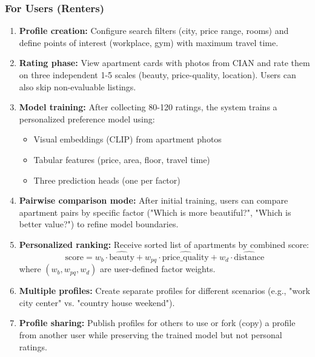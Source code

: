 \documentclass[12pt,a4paper]{article}
\begin{document}
\subsubsection{For Users (Renters)}
\begin{enumerate}
    \item \textbf{Profile creation:} Configure search filters (city, price range, rooms) and define points of interest (workplace, gym) with maximum travel time.
    
    \item \textbf{Rating phase:} View apartment cards with photos from CIAN and rate them on three independent 1-5 scales (beauty, price-quality, location). Users can also skip non-evaluable listings.
    
    \item \textbf{Model training:} After collecting 80-120 ratings, the system trains a personalized preference model using:
    \begin{itemize}
        \item Visual embeddings (CLIP) from apartment photos
        \item Tabular features (price, area, floor, travel time)
        \item Three prediction heads (one per factor)
    \end{itemize}
    
    \item \textbf{Pairwise comparison mode:} After initial training, users can compare apartment pairs by specific factor ("Which is more beautiful?", "Which is better value?") to refine model boundaries.
    
    \item \textbf{Personalized ranking:} Receive sorted list of apartments by combined score:
    $$\text{score} = w_b \cdot \hat{\text{beauty}} + w_{pq} \cdot \hat{\text{price\_quality}} + w_d \cdot \hat{\text{distance}}$$
    where $(w_b, w_{pq}, w_d)$ are user-defined factor weights.
    
    \item \textbf{Multiple profiles:} Create separate profiles for different scenarios (e.g., "work city center" vs. "country house weekend").
    
    \item \textbf{Profile sharing:} Publish profiles for others to use or fork (copy) a profile from another user while preserving the trained model but not personal ratings.
\end{enumerate}
\end{document}
